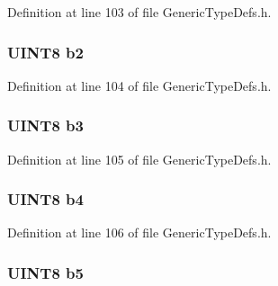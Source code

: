 Definition at line 103 of file Generic\+Type\+Defs.\+h.

\hypertarget{union_u_i_n_t8___v_a_l_a2ad49445b4bb437bcd0e0c20c5d21050}{}
\subsubsection[{b2}]{ {\bf U\+I\+N\+T8} b2}\label{union_u_i_n_t8___v_a_l_a2ad49445b4bb437bcd0e0c20c5d21050}


Definition at line 104 of file Generic\+Type\+Defs.\+h.

\hypertarget{union_u_i_n_t8___v_a_l_a8392e255640c8dfc55767a2a8e9fa1a0}{}
\subsubsection[{b3}]{ {\bf U\+I\+N\+T8} b3}\label{union_u_i_n_t8___v_a_l_a8392e255640c8dfc55767a2a8e9fa1a0}


Definition at line 105 of file Generic\+Type\+Defs.\+h.

\hypertarget{union_u_i_n_t8___v_a_l_a9df872f78e71aa916d06d8a382ed8524}{}
\subsubsection[{b4}]{ {\bf U\+I\+N\+T8} b4}\label{union_u_i_n_t8___v_a_l_a9df872f78e71aa916d06d8a382ed8524}


Definition at line 106 of file Generic\+Type\+Defs.\+h.

\hypertarget{union_u_i_n_t8___v_a_l_aa4751b288a52c78236f43095fb0f8235}{}
\subsubsection[{b5}]{ {\bf U\+I\+N\+T8} b5}\label{union_u_i_n_t8___v_a_l_aa4751b288a52c78236f43095fb0f8235}


